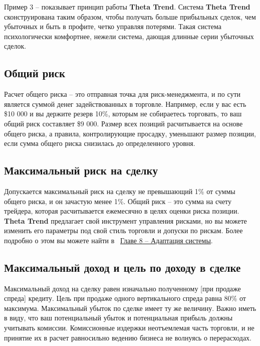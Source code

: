\documentclass[12pt,DIV=18]{scrartcl}
\begin{document}
\bigskip
 
Пример 3 -- показывает принцип работы \textbf{Theta Trend}. Система \textbf{Theta Trend} сконструирована таким образом, чтобы получать больше прибыльных сделок, чем убыточных и быть в профите, четко управляя потерями. Такая система психологически комфортнее, нежели система, дающая длинные серии убыточных сделок.

\subsection*{Общий риск}

Расчет общего риска -- это отправная точка для риск-менеджмента, и по сути является суммой денег задействованных в торговле. Например, если у вас есть \$10 000 и вы держите резерв 10\%, которым не собираетесь торговать, то ваш общий риск составляет \$9 000. Размер всех позиций расчитывается на основе общего риска, а правила, контролирующие просадку, уменьшают размер позиции, если сумма общего риска снизилась до определенного уровня.

\subsection*{Максимальный риск на сделку}

Допускается максимальный риск на сделку не превышающий 1\% от суммы общего риска, и он зачастую менее 1\%. Общий риск -- это сумма на счету трейдера, которая расчитывается ежемесячно в целях оценки риска позиции. \textbf{Theta Trend} предлагает свой инструмент управления рисками, но вы можете изменить его параметры под свой стиль торговли и допуски по рискам. Более подробно о этом вы можете найти в ~\hyperref[chapter8]{\ul{Главе 8} -- Адаптация системы}.

\subsection*{Максимальный доход и цель по доходу в сделке}

Максимальный доход на сделку равен изначально полученному [при продаже спреда] кредиту. Цель при продаже одного вертикального спреда равна 80\% от максимума. Максимальный убыток по сделке имеет ту же величину. Важно иметь в виду, что ваш потенциальный убыток и потенциальная прибыль должны учитывать комиссии. Комиссионные издержки неотъемлемая часть торговли, и не принятие их в расчет равносильно ведению бизнеса не волнуясь о перерасходах.

\bigskip
\end{document}
